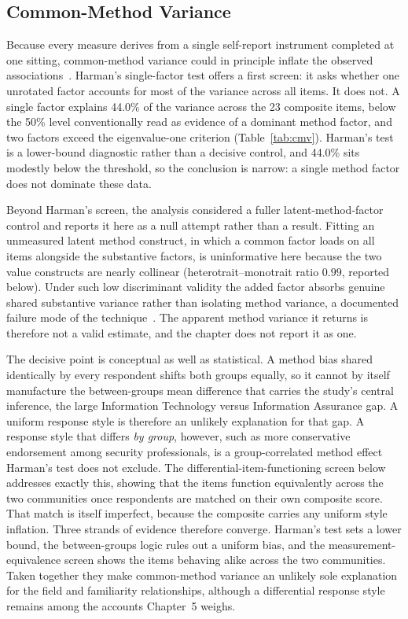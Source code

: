 \subsection{Common-Method Variance}

Because every measure derives from a single self-report instrument completed at one sitting, common-method variance could in principle inflate the observed associations~\parencite{Podsakoff_2003}. Harman's single-factor test offers a first screen: it asks whether one unrotated factor accounts for most of the variance across all items. It does not. A single factor explains 44.0\% of the variance across the 23 composite items, below the 50\% level conventionally read as evidence of a dominant method factor, and two factors exceed the eigenvalue-one criterion (Table~\ref{tab:cmv}). Harman's test is a lower-bound diagnostic rather than a decisive control, and 44.0\% sits modestly below the threshold, so the conclusion is narrow: a single method factor does not dominate these data.

Beyond Harman's screen, the analysis considered a fuller latent-method-factor control and reports it here as a null attempt rather than a result. Fitting an unmeasured latent method construct, in which a common factor loads on all items alongside the substantive factors, is uninformative here because the two value constructs are nearly collinear (heterotrait--monotrait ratio $0.99$, reported below). Under such low discriminant validity the added factor absorbs genuine shared substantive variance rather than isolating method variance, a documented failure mode of the technique~\parencite{Podsakoff_2003}. The apparent method variance it returns is therefore not a valid estimate, and the chapter does not report it as one.

The decisive point is conceptual as well as statistical. A method bias shared identically by every respondent shifts both groups equally, so it cannot by itself manufacture the between-groups mean difference that carries the study's central inference, the large Information Technology versus Information Assurance gap. A uniform response style is therefore an unlikely explanation for that gap. A response style that differs \emph{by group}, however, such as more conservative endorsement among security professionals, is a group-correlated method effect Harman's test does not exclude. The differential-item-functioning screen below addresses exactly this, showing that the items function equivalently across the two communities once respondents are matched on their own composite score. That match is itself imperfect, because the composite carries any uniform style inflation. Three strands of evidence therefore converge. Harman's test sets a lower bound, the between-groups logic rules out a uniform bias, and the measurement-equivalence screen shows the items behaving alike across the two communities. Taken together they make common-method variance an unlikely sole explanation for the field and familiarity relationships, although a differential response style remains among the accounts Chapter~5 weighs.

